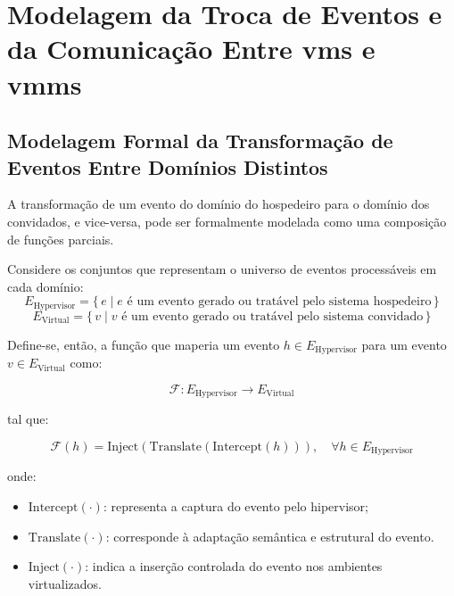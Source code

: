 \section{Modelagem da Troca de Eventos e da Comunicação Entre \glspl{vm} e \glspl{vmm}}

\subsection{Modelagem Formal da Transformação de Eventos Entre Domínios Distintos}

A transformação de um evento do domínio do hospedeiro para o domínio dos convidados, e vice-versa, pode ser formalmente modelada como uma composição de funções parciais.

Considere os conjuntos que representam o universo de eventos processáveis em cada domínio:
\begin{equation}
E_{\mathrm{Hypervisor}} = \{\, e \mid e \text{ é um evento gerado ou tratável pelo sistema hospedeiro} \,\}
\end{equation}
\begin{equation}
E_{\mathrm{Virtual}} = \{\, v \mid v \text{ é um evento gerado ou tratável pelo sistema convidado} \,\}
\end{equation}

Define-se, então, a função que maperia um evento $h \in E_{\mathrm{Hypervisor}}$ para um evento $v \in E_{\mathrm{Virtual}}$ como:

\begin{equation}
\mathcal{F} : E_{\mathrm{Hypervisor}} \rightarrow E_{\mathrm{Virtual}}
\end{equation}

tal que:

\begin{equation}
\mathcal{F}(h) = \mathrm{Inject}(\mathrm{Translate}(\mathrm{Intercept}(h))), \quad \forall h \in E_{\mathrm{Hypervisor}}
\end{equation}

onde:

\begin{itemize}
    \item $\mathrm{Intercept}(\cdot)$: representa a captura do evento pelo hipervisor;
    \item $\mathrm{Translate}(\cdot)$: corresponde à adaptação semântica e estrutural do evento.
    \item $\mathrm{Inject}(\cdot)$: indica a inserção controlada do evento nos ambientes virtualizados.
\end{itemize}

